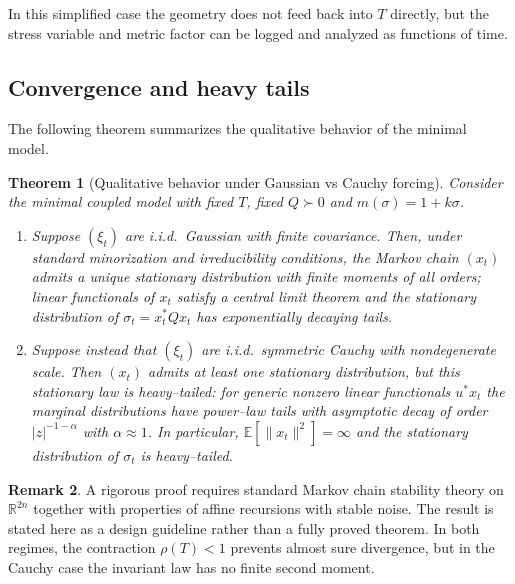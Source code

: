\documentclass[11pt]{article}
\theoremstyle{plain}
\newtheorem{theorem}{Theorem}[section]
\theoremstyle{definition}
\newtheorem{remark}[theorem]{Remark}
\numberwithin{equation}{section}
\begin{document}
In this simplified case the geometry does not feed back into
$T$ directly, but the stress variable and metric factor can be logged
and analyzed as functions of time.

\subsection{Convergence and heavy tails}

The following theorem summarizes the qualitative behavior of the
minimal model.

\begin{theorem}[Qualitative behavior under Gaussian vs Cauchy forcing]
\label{thm:gauss-cauchy-qualitative}
Consider the minimal coupled model with fixed $T$, fixed $Q \succ 0$
and $m(\sigma) = 1 + k\sigma$.

\begin{enumerate}[label=(\roman*)]
  \item Suppose $(\xi_t)$ are i.i.d.\ Gaussian with finite covariance.
  Then, under standard minorization and irreducibility conditions, the
  Markov chain $(x_t)$ admits a unique stationary distribution with
  finite moments of all orders; linear functionals of $x_t$ satisfy a
  central limit theorem and the stationary distribution of
  $\sigma_t = x_t^\ast Q x_t$ has exponentially decaying tails.

  \item Suppose instead that $(\xi_t)$ are i.i.d.\ symmetric Cauchy
  with nondegenerate scale. Then $(x_t)$ admits at least one stationary
  distribution, but this stationary law is heavy--tailed: for generic
  nonzero linear functionals $u^\ast x_t$ the marginal distributions
  have power--law tails with asymptotic decay of order
  $|z|^{-1-\alpha}$ with $\alpha \approx 1$. In particular,
  $\mathbb{E}[\|x_t\|^2] = \infty$ and the stationary distribution of
  $\sigma_t$ is heavy--tailed.
\end{enumerate}
\end{theorem}

\begin{remark}
A rigorous proof requires standard Markov chain stability theory on
$\mathbb{R}^{2n}$ together with properties of affine recursions with
stable noise. The result is stated here as a design guideline rather
than a fully proved theorem. In both regimes, the contraction
$\rho(T)<1$ prevents almost sure divergence, but in the Cauchy case
the invariant law has no finite second moment.
\end{remark}
\end{document}
